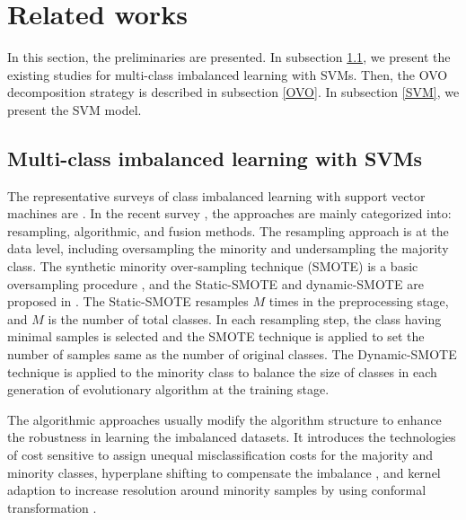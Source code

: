 \section{Related works}
\label{RelatedWork}

In this section, the preliminaries are presented. In subsection \ref{ImbalancedDatasets}, we present the existing studies for multi-class imbalanced learning with SVMs. Then, the OVO decomposition strategy is described in subsection \ref{OVO}. In subsection \ref{SVM}, we present the SVM model. 


\subsection{Multi-class imbalanced learning with SVMs}
\label{ImbalancedDatasets}


The representative surveys of class imbalanced learning with support vector machines are \cite{review-book} \cite{Review2024}. In the recent survey \cite{Review2024}, the approaches are mainly categorized into: resampling, algorithmic, and fusion methods. The resampling approach is at the data level, including oversampling the minority and undersampling the majority class. The synthetic minority over-sampling technique (SMOTE) is a basic oversampling procedure \cite{2002SMOTE}, and the Static-SMOTE and dynamic-SMOTE are proposed in \cite{Francisco2011A}. The Static-SMOTE resamples $M$ times in the preprocessing stage, and $M$ is the number of total classes. In each resampling step, the class having minimal samples is selected and the SMOTE technique is applied to set the number of samples same as the number of original classes. The Dynamic-SMOTE technique is applied to the minority class to balance the size of classes in each generation of evolutionary algorithm at the training stage.


The algorithmic approaches usually modify the algorithm structure to enhance the robustness in learning the imbalanced datasets\cite{Review2024}. It introduces the technologies of cost sensitive to assign unequal misclassification costs for the majority and minority classes\cite{article_dcs}, hyperplane shifting to compensate the imbalance \cite{2015Near} \cite{hypershift2006}, and kernel adaption to increase resolution around minority samples by using conformal transformation \cite {kernel} \cite {kernal2023}. 

